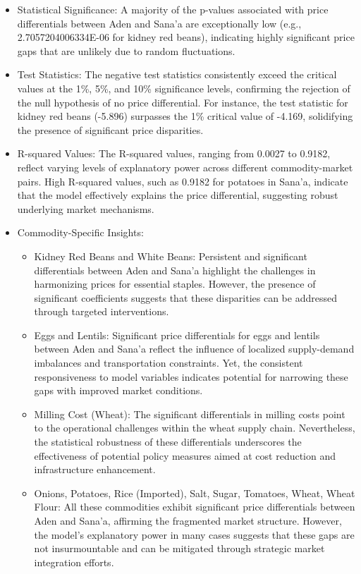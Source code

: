 \begin{itemize}
\item Statistical Significance: A majority of the p-values associated with price differentials between Aden and Sana'a are exceptionally low (e.g., 2.7057204006334E-06 for kidney red beans), indicating highly significant price gaps that are unlikely due to random fluctuations.

\item Test Statistics: The negative test statistics consistently exceed the critical values at the 1\%, 5\%, and 10\% significance levels, confirming the rejection of the null hypothesis of no price differential. For instance, the test statistic for kidney red beans (-5.896) surpasses the 1\% critical value of -4.169, solidifying the presence of significant price disparities.

\item R-squared Values: The R-squared values, ranging from 0.0027 to 0.9182, reflect varying levels of explanatory power across different commodity-market pairs. High R-squared values, such as 0.9182 for potatoes in Sana'a, indicate that the model effectively explains the price differential, suggesting robust underlying market mechanisms.

\item Commodity-Specific Insights:
  \begin{itemize}
  \item Kidney Red Beans and White Beans: Persistent and significant differentials between Aden and Sana'a highlight the challenges in harmonizing prices for essential staples. However, the presence of significant coefficients suggests that these disparities can be addressed through targeted interventions.
  
  \item Eggs and Lentils: Significant price differentials for eggs and lentils between Aden and Sana'a reflect the influence of localized supply-demand imbalances and transportation constraints. Yet, the consistent responsiveness to model variables indicates potential for narrowing these gaps with improved market conditions.
  
  \item Milling Cost (Wheat): The significant differentials in milling costs point to the operational challenges within the wheat supply chain. Nevertheless, the statistical robustness of these differentials underscores the effectiveness of potential policy measures aimed at cost reduction and infrastructure enhancement.
  
  \item Onions, Potatoes, Rice (Imported), Salt, Sugar, Tomatoes, Wheat, Wheat Flour: All these commodities exhibit significant price differentials between Aden and Sana'a, affirming the fragmented market structure. However, the model's explanatory power in many cases suggests that these gaps are not insurmountable and can be mitigated through strategic market integration efforts.
  \end{itemize}
\end{itemize}

